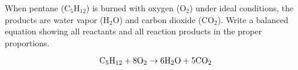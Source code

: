 

When pentane (C$_{5}$H$_{12}$) is burned with oxygen (O$_{2}$) under ideal conditions, the products are water vapor (H$_{2}$O) and carbon dioxide (CO$_{2}$).  Write a balanced equation showing all reactants and all reaction products in the proper proportions.







$$\hbox{C}_5\hbox{H}_{12} + \hbox{8O}_2 \to \hbox{6H}_2\hbox{O} + \hbox{5CO}_2$$











